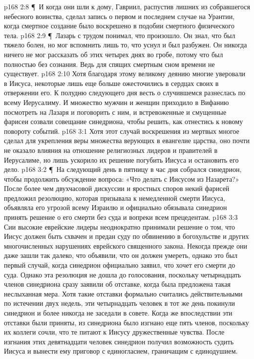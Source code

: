 \vs p168 2:8 \P\ И когда они шли к дому, Гавриил, распустив лишних из собравшегося небесного воинства, сделал запись о первом и последнем случае на Урантии, когда смертное создание было воскрешено в подобии смертного физического тела.
\vs p168 2:9 \P\ Лазарь с трудом понимал, что произошло. Он знал, что был тяжело болен, но мог вспомнить лишь то, что уснул и был разбужен. Он никогда ничего не мог рассказать об этих четырех днях во гробе, потому что был полностью без сознания. Ведь для спящих смертным сном времени не существует.
\vs p168 2:10 Хотя благодаря этому великому деянию многие уверовали в Иисуса, некоторые лишь еще больше ожесточились в сердцах своих в отвержении его. К полудню следующего дня весть о случившемся разнеслась по всему Иерусалиму. И множество мужчин и женщин приходило в Вифанию посмотреть на Лазаря и поговорить с ним, и встревоженные и смущенные фарисеи созвали совещание синедриона, чтобы решить, как отнестись к новому повороту событий.
\vs p168 3:1 Хотя этот случай воскрешения из мертвых многое сделал для укрепления веры множества верующих в евангелие царства, оно почти не оказало влияния на отношение религиозных лидеров и правителей в Иерусалиме, но лишь ускорило их решение погубить Иисуса и остановить его дело.
\vs p168 3:2 \P\ На следующий день в пятницу в час дня собрался синедрион, чтобы продолжить обсуждение вопроса: «Что делать с Иисусом из Назарета?» После более чем двухчасовой дискуссии и яростных споров некий фарисей предложил резолюцию, которая призывала к немедленной смерти Иисуса, объявляла его угрозой всему Израилю и официально обязывала синедрион принять решение о его смерти без суда и вопреки всем прецедентам.
\vs p168 3:3 Сии высокие еврейские лидеры неоднократно принимали решение о том, что Иисус должен быть схвачен и предан суду по обвинению в богохульстве и других многочисленных нарушениях еврейского священного закона. Некогда прежде они даже зашли так далеко, что объявили, что он должен умереть, однако это был первый случай, когда синедрион официально заявил, что хочет его смерти до суда. Однако эта резолюция не дошла до голосования, поскольку четырнадцать членов синедриона сразу заявили об отставке, когда была предложена такая неслыханная мера. Хотя такие отставки формально считались действительными по истечении двух недель, эти четырнадцать человек в тот же день покинули синедрион и более никогда не заседали в совете. Когда же впоследствии эти отставки были приняты, из синедриона было изгнано еще пять членов, поскольку их коллеги сочли, что те питают к Иисусу дружественные чувства. После изгнания этих девятнадцати человек синедрион получил возможность судить Иисуса и вынести ему приговор с единогласием, граничащим с единодушием.
